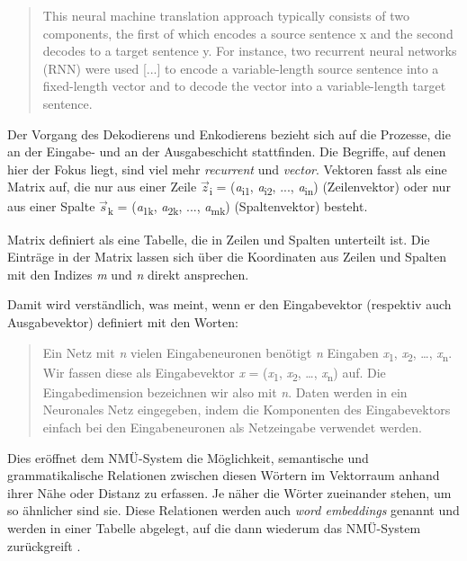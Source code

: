 \begin{quote} 

This neural machine translation approach typically consists of two components, the first of which encodes a source sentence x and the second decodes to a target sentence y. For instance, two recurrent neural networks (RNN) were used [...] to encode a variable-length source sentence into a fixed-length vector and to decode the vector into a variable-length target sentence.
\label{K3:quote-vektoren}

\end{quote}


Der Vorgang des Dekodierens und Enkodierens bezieht sich auf die Prozesse, die an der Eingabe- und an der Ausgabeschicht stattfinden. Die Begriffe, auf denen hier der Fokus liegt, sind viel mehr \emph{recurrent} und \emph{vector}. Vektoren fasst \citet[2]{seidel_matrizen_2005} als eine Matrix auf, \glqq die nur aus einer Zeile
\emph{$\overrightarrow{z}$}\textsubscript{i} = (\emph{a}\textsubscript{i1}, \emph{a}\textsubscript{i2}, ..., \emph{a}\textsubscript{in}) (Zeilenvektor) oder nur aus einer Spalte \emph{$\overrightarrow{s}$}\textsubscript{k} = (\emph{a}\textsubscript{1k}, \emph{a}\textsubscript{2k}, ..., \emph{a}\textsubscript{mk})
(Spaltenvektor) besteht.\grqq

Matrix definiert \citet[1]{seidel_matrizen_2005} als \glqq eine Tabelle, die in Zeilen und Spalten unterteilt ist. Die Einträge in der Matrix lassen sich über die Koordinaten aus Zeilen und Spalten mit den Indizes \emph{m} und \emph{n} direkt ansprechen.\grqq

Damit wird verständlich, was \citet[51]{kriesel_kleiner_2005} meint, wenn er den Eingabevektor (respektiv auch Ausgabevektor) definiert mit den Worten: 


\begin{quote}
Ein Netz mit \emph{n} vielen Eingabeneuronen benötigt \emph{n} Eingaben \emph{x}\textsubscript{1},  \emph{x}\textsubscript{2},  \ldots, \emph{x}\textsubscript{n}. Wir fassen diese als Eingabevektor \emph{x} = (\emph{x}\textsubscript{1},  \emph{x}\textsubscript{2},  \ldots, \emph{x}\textsubscript{n}) auf. Die Eingabedimension bezeichnen wir also mit \emph{n}. Daten werden in ein Neuronales Netz eingegeben, indem die Komponenten des Eingabevektors einfach bei den Eingabeneuronen als Netzeingabe verwendet werden.
\end{quote}


Dies eröffnet dem NMÜ-System die Möglichkeit, \glqq semantische und grammatikalische Relationen zwischen diesen Wörtern\grqq{} \citep[40]{kruger_von_2017} im Vektorraum anhand ihrer Nähe oder Distanz zu erfassen. Je näher die Wörter zueinander stehen, um so ähnlicher sind sie. Diese Relationen werden auch \emph{word embeddings} genannt und werden in einer Tabelle abgelegt, auf die dann wiederum das NMÜ-System zurückgreift \citep[40]{kruger_von_2017}. 

